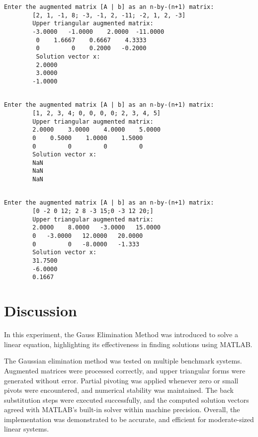 \documentclass[a4paper,12pt]{article}
\begin{document}
	\begin{lstlisting}[style=vscode-light, caption={Command Window for Standard Case (Unique Solution)} ]
        Enter the augmented matrix [A | b] as an n-by-(n+1) matrix:
        [2, 1, -1, 8; -3, -1, 2, -11; -2, 1, 2, -3]
        Upper triangular augmented matrix:
        -3.0000   -1.0000    2.0000  -11.0000
         0    1.6667    0.6667    4.3333
         0         0    0.2000   -0.2000
         Solution vector x:
         2.0000
         3.0000
        -1.0000


	\end{lstlisting}
		\begin{lstlisting}[style=vscode-light, caption={Command Window for All-Zero Row} ]
		Enter the augmented matrix [A | b] as an n-by-(n+1) matrix: 
		[1, 2, 3, 4; 0, 0, 0, 0; 2, 3, 4, 5]
		Upper triangular augmented matrix:
		2.0000    3.0000    4.0000    5.0000
		0    0.5000    1.0000    1.5000
		0         0         0         0
		Solution vector x:
		NaN
		NaN
		NaN
		
	\end{lstlisting}
		\begin{lstlisting}[style=vscode-light, caption={Command Window for zero Pivot Requiring Row Swap} ]
		Enter the augmented matrix [A | b] as an n-by-(n+1) matrix: 
		[0 -2 0 12; 2 8 -3 15;0 -3 12 20;]
    	Upper triangular augmented matrix:
    	2.0000    8.0000   -3.0000   15.0000
	    0   -3.0000   12.0000   20.0000
    	0         0   -8.0000   -1.333
    	Solution vector x:
    	31.7500
    	-6.0000
    	0.1667

	\end{lstlisting}
\section{Discussion}
	In this experiment, the Gauss Elimination Method was introduced to solve a linear equation, highlighting its effectiveness in finding solutions using MATLAB. 
	
The Gaussian elimination method was tested on multiple benchmark systems. Augmented matrices were processed correctly, and upper triangular forms were generated without error. Partial pivoting was applied whenever zero or small pivots were encountered, and numerical stability was maintained. The back substitution steps were executed successfully, and the computed solution vectors agreed with MATLAB’s built-in solver within machine precision. Overall, the implementation was demonstrated to be accurate, and efficient for moderate-sized linear systems.

	
	
	
	
	
	
	
	
\end{document}
